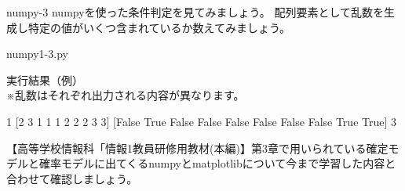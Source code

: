 \begin{pabox}{numpy-3}
numpyを使った条件判定を見てみましょう。
配列要素として乱数を生成し特定の値がいくつ含まれているか数えてみましょう。

\begin{legbox}{numpy1-3.py}

実行結果（例）\\
※乱数はそれぞれ出力される内容が異なります。\\
\begin{listing}{1}
[2 3 1 1 1 2 2 2 3 3]
[False  True False False False False False False  True  True]
3
\end{listing}
\end{legbox}

\end{pabox}

【高等学校情報科「情報1教員研修用教材(本編)】第3章で用いられている確定モデルと確率モデルに出てくるnumpyとmatplotlibについて今まで学習した内容と合わせて確認しましょう。

